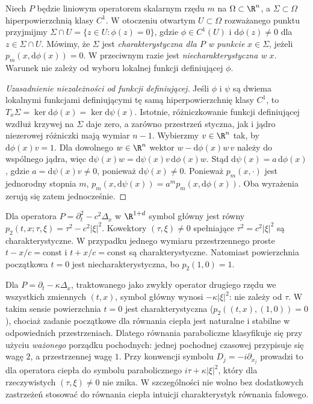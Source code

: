 \begin{definicja}
Niech $P$ będzie liniowym operatorem skalarnym rzędu $m$ na
$\Omega\subset\R^n$, a $\Sigma\subset\Omega$ hiperpowierzchnią klasy $C^1$.
W otoczeniu otwartym $U\subset\Omega$ rozważanego punktu przyjmijmy
$\Sigma\cap U=\{z\in U:\phi(z)=0\}$, gdzie
$\phi\in C^1(U)$ i $\mathrm d\phi(z)\ne0$ dla $z\in\Sigma\cap U$.
Mówimy, że $\Sigma$ jest \emph{charakterystyczna dla $P$
w punkcie} $x\in\Sigma$, jeżeli
$p_m(x,\mathrm d\phi(x))=0$. W przeciwnym razie jest
\emph{niecharakterystyczna w $x$}. Warunek nie zależy od
wyboru lokalnej funkcji definiującej $\phi$.
\end{definicja}

\begin{proof}[Uzasadnienie niezależności od funkcji definiującej]
Jeśli $\phi$ i $\psi$ są dwiema lokalnymi funkcjami definiującymi
tę samą hiperpowierzchnię klasy $C^1$, to
$T_x\Sigma=\ker\mathrm d\phi(x)=\ker\mathrm d\psi(x)$.
Istotnie, różniczkowanie funkcji definiującej wzdłuż krzywej
na $\Sigma$ daje zero, a zarówno przestrzeń styczna, jak i jądro
niezerowej różniczki mają wymiar $n-1$. Wybierzmy $v\in\R^n$
tak, by $\mathrm d\phi(x)v=1$. Dla dowolnego $w\in\R^n$
wektor $w-\mathrm d\phi(x)w\,v$ należy do wspólnego jądra,
więc $\mathrm d\psi(x)w=\mathrm d\psi(x)v\,\mathrm d\phi(x)w$.
Stąd $\mathrm d\psi(x)=a\,\mathrm d\phi(x)$, gdzie
$a=\mathrm d\psi(x)v\ne0$, ponieważ $\mathrm d\psi(x)\ne0$.
Ponieważ $p_m(x,\cdot)$ jest jednorodny stopnia $m$,
$p_m(x,\mathrm d\psi(x))=a^mp_m(x,\mathrm d\phi(x))$.
Oba wyrażenia zerują się zatem jednocześnie.
\end{proof}

\begin{przyklad}
Dla operatora $P=\partial_t^2-c^2\Delta_x$ w $\R^{1+d}$
symbol główny jest równy
$p_2(t,x;\tau,\xi)=\tau^2-c^2|\xi|^2$.
Kowektory $(\tau,\xi)\ne0$ spełniające
$\tau^2=c^2|\xi|^2$ są charakterystyczne. W przypadku
jednego wymiaru przestrzennego proste $t-x/c=\mathrm{const}$
i $t+x/c=\mathrm{const}$ są charakterystyczne.
Natomiast powierzchnia początkowa $t=0$ jest
niecharakterystyczna, bo $p_2(1,0)=1$.
\end{przyklad}

\begin{uwaga}
Dla $P=\partial_t-\kappa\Delta_x$, traktowanego jako zwykły
operator drugiego rzędu we wszystkich zmiennych $(t,x)$,
symbol główny wynosi $-\kappa|\xi|^2$: nie zależy od $\tau$.
W takim sensie powierzchnia $t=0$ jest charakterystyczna
($p_2((t,x),(1,0))=0$),
chociaż zadanie początkowe dla równania ciepła jest naturalne
i stabilne w odpowiednich przestrzeniach. Dlatego równania
paraboliczne klasyfikuje się przy użyciu \emph{ważonego}
porządku pochodnych: jednej pochodnej czasowej przypisuje się
wagę $2$, a przestrzennej wagę $1$. Przy konwencji symbolu
$D_j=-i\partial_{x_j}$ prowadzi to dla operatora ciepła do
symbolu parabolicznego $i\tau+\kappa|\xi|^2$, który dla
rzeczywistych $(\tau,\xi)\ne0$ nie znika. W szczególności
nie wolno bez dodatkowych zastrzeżeń stosować do równania
ciepła intuicji charakterystyk równania falowego.
\end{uwaga}


